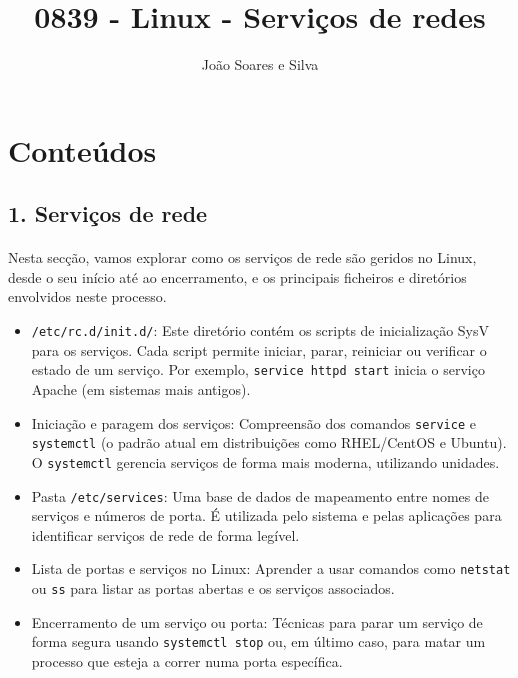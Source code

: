 \documentclass[10pt,a4paper]{article}
\title{0839 - Linux - Serviços de redes}
\author{João Soares e Silva}
\begin{document}
	\maketitle
	
		
		\section*{Conteúdos}
		
		\subsection*{1. Serviços de rede}
		\vspace{-1.2em}
		\paragraph{}
		Nesta secção, vamos explorar como os serviços de rede são geridos no Linux, desde o seu início até ao encerramento, e os principais ficheiros e diretórios envolvidos neste processo.
		
		\begin{itemize}
			\item \texttt{/etc/rc.d/init.d/}: Este diretório contém os scripts de inicialização SysV para os serviços. Cada script permite iniciar, parar, reiniciar ou verificar o estado de um serviço. Por exemplo, \texttt{service httpd start} inicia o serviço Apache (em sistemas mais antigos).
			\item Iniciação e paragem dos serviços: Compreensão dos comandos \texttt{service} e \texttt{systemctl} (o padrão atual em distribuições como RHEL/CentOS e Ubuntu). O \texttt{systemctl} gerencia serviços de forma mais moderna, utilizando unidades.
			\item Pasta \texttt{/etc/services}: Uma base de dados de mapeamento entre nomes de serviços e números de porta. É utilizada pelo sistema e pelas aplicações para identificar serviços de rede de forma legível.
			\item Lista de portas e serviços no Linux: Aprender a usar comandos como \texttt{netstat} ou \texttt{ss} para listar as portas abertas e os serviços associados.
			\item Encerramento de um serviço ou porta: Técnicas para parar um serviço de forma segura usando \texttt{systemctl stop} ou, em último caso, para matar um processo que esteja a correr numa porta específica.
		\end{itemize}
		
\end{document}
